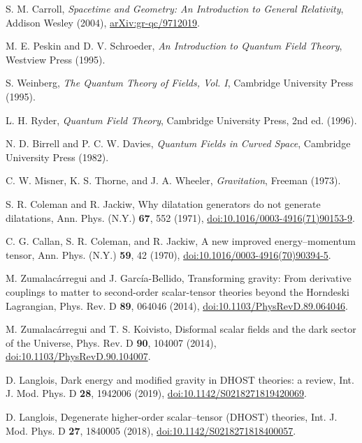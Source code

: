 \documentclass{article}
\begin{document}
\begin{thebibliography}{99}
S. M. Carroll, \emph{Spacetime and Geometry: An Introduction to General Relativity}, 
Addison Wesley (2004),
\href{https://arxiv.org/abs/gr-qc/9712019}{arXiv:gr-qc/9712019}.

M. E. Peskin and D. V. Schroeder, \emph{An Introduction to Quantum Field Theory}, 
Westview Press (1995).

S. Weinberg, \emph{The Quantum Theory of Fields, Vol. I}, 
Cambridge University Press (1995).

L. H. Ryder, \emph{Quantum Field Theory}, 
Cambridge University Press, 2nd ed. (1996).

N. D. Birrell and P. C. W. Davies, \emph{Quantum Fields in Curved Space}, 
Cambridge University Press (1982).

C. W. Misner, K. S. Thorne, and J. A. Wheeler, \emph{Gravitation}, 
Freeman (1973).

S. R. Coleman and R. Jackiw, Why dilatation generators do not generate dilatations, 
Ann. Phys. (N.Y.) \textbf{67}, 552 (1971),
\href{https://doi.org/10.1016/0003-4916(71)90153-9}{doi:10.1016/0003-4916(71)90153-9}.

C. G. Callan, S. R. Coleman, and R. Jackiw, A new improved energy–momentum tensor, 
Ann. Phys. (N.Y.) \textbf{59}, 42 (1970),
\href{https://doi.org/10.1016/0003-4916(70)90394-5}{doi:10.1016/0003-4916(70)90394-5}.

M. Zumalacárregui and J. García-Bellido, Transforming gravity: From derivative couplings to matter to second-order scalar-tensor theories beyond the Horndeski Lagrangian, 
Phys. Rev. D \textbf{89}, 064046 (2014),
\href{https://doi.org/10.1103/PhysRevD.89.064046}{doi:10.1103/PhysRevD.89.064046}.

M. Zumalacárregui and T. S. Koivisto, Disformal scalar fields and the dark sector of the Universe, 
Phys. Rev. D \textbf{90}, 104007 (2014),
\href{https://doi.org/10.1103/PhysRevD.90.104007}{doi:10.1103/PhysRevD.90.104007}.

D. Langlois, Dark energy and modified gravity in DHOST theories: a review, 
Int. J. Mod. Phys. D \textbf{28}, 1942006 (2019),
\href{https://doi.org/10.1142/S0218271819420069}{doi:10.1142/S0218271819420069}.

D. Langlois, Degenerate higher-order scalar–tensor (DHOST) theories, 
Int. J. Mod. Phys. D \textbf{27}, 1840005 (2018),
\href{https://doi.org/10.1142/S0218271818400057}{doi:10.1142/S0218271818400057}.


\end{thebibliography}
\end{document}
